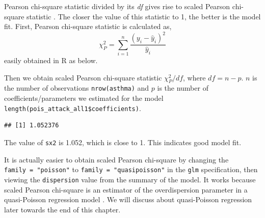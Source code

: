 \documentclass[
  10pt,
]{krantz}
\newenvironment{Shaded}{\begin{snugshade}}{\end{snugshade}}
\newcommand{\DecValTok}[1]{\textcolor[rgb]{0.00,0.00,0.81}{#1}}
\newcommand{\FunctionTok}[1]{\textcolor[rgb]{0.00,0.00,0.00}{#1}}
\newcommand{\NormalTok}[1]{#1}
\newcommand{\OtherTok}[1]{\textcolor[rgb]{0.56,0.35,0.01}{#1}}
\newcommand{\SpecialCharTok}[1]{\textcolor[rgb]{0.00,0.00,0.00}{#1}}
\begin{document}
Pearson chi-square statistic divided by its \emph{df} gives rise to scaled Pearson chi-square statistic \citep{fleiss2003}. The closer the value of this statistic to 1, the better is the model fit. First, Pearson chi-square statistic is calculated as,
\[\chi^2_P = \sum_{i=1}^n \frac{(y_i - \hat y_i)^2}{\hat y_i}\]
easily obtained in R as below.

\begin{Shaded}
\end{Shaded}

Then we obtain scaled Pearson chi-square statistic \(\chi^2_P / df\), where \(df = n - p\). \(n\) is the number of observations \texttt{nrow(asthma)} and \(p\) is the number of coefficients/parameters we estimated for the model \texttt{length(pois\_attack\_all1\$coefficients)}.

\begin{Shaded}
\end{Shaded}

\begin{verbatim}
## [1] 1.052376
\end{verbatim}

The value of \texttt{sx2} is 1.052, which is close to 1. This indicates good model fit.

It is actually easier to obtain scaled Pearson chi-square by changing the \texttt{family\ =\ "poisson"} to \texttt{family\ =\ "quasipoisson"} in the \texttt{glm} specification, then viewing the \texttt{dispersion} value from the summary of the model. It works because scaled Pearson chi-square is an estimator of the overdispersion parameter in a quasi-Poisson regression model \citep{fleiss2003}. We will discuss about quasi-Poisson regression later towards the end of this chapter.
\end{document}
